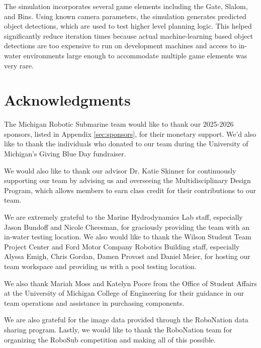 \documentclass[conference]{IEEEtran}
\begin{document}
The simulation incorporates several game elements including the Gate, Slalom, and Bins. Using known camera parameters, the simulation generates predicted object detections, which are used to test higher level planning logic. This helped significantly reduce iteration times because actual machine-learning based object detections are too expensive to run on development machines and access to in-water environments large enough to accommodate multiple game elements was very rare.

\section*{Acknowledgments}
The Michigan Robotic Submarine team would like to thank our 2025-2026 sponsors, listed in Appendix \ref{sec:sponsors}, for their monetary support. We'd also like to thank the individuals who donated to our team during the University of Michigan's Giving Blue Day fundraiser. 

We would also like to thank our advisor Dr. Katie Skinner for continuously supporting our team by advising us and overseeing the Multidisciplinary Design Program, which allows members to earn class credit for their contributions to our team.

We are extremely grateful to the Marine Hydrodynamics Lab staff, especially Jason Bundoff and Nicole Cheesman, for graciously providing the team with an in-water testing location.  We also would like to thank the Wilson Student Team Project Center and Ford Motor Company Robotics Building staff, especially Alyssa Emigh, Chris Gordan, Damen Provost and Daniel Meier, for hosting our team workspace and providing us with a pool testing location.

We also thank Mariah Moss and Katelyn Poore from the Office of Student Affairs at the University of Michigan College of Engineering for their guidance in our team operations and assistance in purchasing components.

We are also grateful for the image data provided through the RoboNation data sharing program. Lastly, we would like to thank the RoboNation team for organizing the RoboSub competition and making all of this possible.
\end{document}
